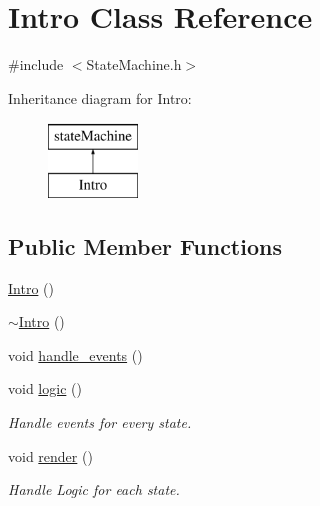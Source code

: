 \hypertarget{class_intro}{\section{Intro Class Reference}
\label{class_intro}
}


{\ttfamily \#include $<$State\-Machine.\-h$>$}

Inheritance diagram for Intro\-:\begin{figure}[H]
\begin{center}
\leavevmode
\includegraphics[height=2.000000cm]{class_intro}
\end{center}
\end{figure}
\subsection*{Public Member Functions}
\begin{DoxyCompactItemize}
\item 
\hyperlink{class_intro_a39875a338e68b4e2fba74693131ae498}{Intro} ()
\item 
\hyperlink{class_intro_a024067dadaf97daca3bfeb0f22e9c183}{$\sim$\-Intro} ()
\item 
void \hyperlink{class_intro_ab559f39689d24f41f3bc03791241974f}{handle\-\_\-events} ()
\item 
void \hyperlink{class_intro_abca960766a7e6e977be5e56e59637afd}{logic} ()
\begin{DoxyCompactList}\small\item\em Handle events for every state. \end{DoxyCompactList}\item 
void \hyperlink{class_intro_afa2ad2d82a78c9fbc38c1fdeeae80992}{render} ()
\begin{DoxyCompactList}\small\item\em Handle Logic for each state. \end{DoxyCompactList}\end{DoxyCompactItemize}


